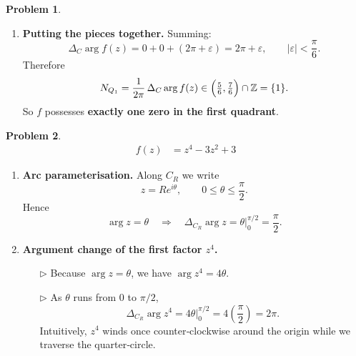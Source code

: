 \documentclass[12pt]{article}
\theoremstyle{definition} %
\newtheorem{problem}{Problem}
\theoremstyle{plain} %
\begin{document}
\begin{problem}
\begin{enumerate}
        \item \textbf{Putting the pieces together.}  
              Summing:
              $$
                  \Delta_C\arg f(z)
                  = 0 + 0 + (2\pi+\varepsilon)
                  = 2\pi+\varepsilon,
                  \qquad |\varepsilon|<\frac{\pi}{6}.
              $$
              Therefore
              $$
                  N_{Q_1}
                  = \frac{1}{2\pi}\,\Delta_C\arg f(z)
                  \in \Bigl(\tfrac56,\tfrac76\Bigr)\cap\mathbb Z
                  = \{1\}.
              $$
              So $f$ possesses \textbf{exactly one zero in the first quadrant}.
    \end{enumerate}
\end{problem}
\begin{problem}
    \begin{align}
        f(z)&=z^{4}-3z^{2}+3
    \end{align}

    \begin{enumerate}
        \item \textbf{Arc parameterisation.}  
              Along $C_{R}$ we write
              \[
                  z = R e^{i\theta},
                  \qquad 0\le\theta\le\frac{\pi}{2}.
              \]
              Hence
              \[
                  \arg z = \theta
                  \quad\Longrightarrow\quad
                  \Delta_{C_R}\arg z
                  = \theta\Big|_{0}^{\pi/2}
                  = \frac{\pi}{2}.
              \]

        \item \textbf{Argument change of the first factor \(z^{4}\).}

              \begin{enumerate}
                  \item[$\triangleright$]  
                        Because \(\arg z=\theta\), we have
                        \(\arg z^{4}=4\theta\).
                  \item[$\triangleright$]  
                        As \(\theta\) runs from \(0\) to \(\pi/2\),
                        \[
                            \Delta_{C_R}\arg z^{4}
                            = 4\theta\Big|_{0}^{\pi/2}
                            = 4\left(\frac{\pi}{2}\right)
                            = 2\pi.
                        \]
                        Intuitively, \(z^{4}\) winds once counter‑clockwise
                        around the origin while we traverse the quarter‑circle.
              \end{enumerate}


\end{enumerate}
\end{problem}
\end{document}
